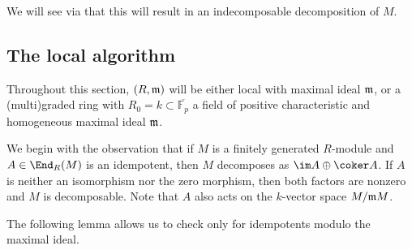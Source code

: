 \documentclass[12pt]{article}
\def\FF{\mathbb F}
\theoremstyle{theorem}
\numberwithin{thm}{section}
\theoremstyle{definition}
\begin{document}
We will see via  that this will result in an indecomposable decomposition of $M$.






\subsection{The local algorithm}\label{sec:main-alg}

Throughout this section, $(R,\mathfrak m)$ will be either local with maximal ideal $\mathfrak m$, or a (multi)graded ring with $R_0 = k \subset \overline{\FF_p}$ a field of positive characteristic and homogeneous maximal ideal $\mathfrak m$.

We begin with the observation that if $M$ is a finitely generated $R$-module and $A\in\End_R(M)$ is an idempotent, then $M$ decomposes as $\im A \oplus \coker A$. If $A$ is neither an isomorphism nor the zero morphism, then both factors are nonzero and $M$ is decomposable. Note that $A$ also acts on the $k$-vector space $M/\mathfrak m M$.

The following lemma allows us to check only for idempotents modulo the maximal ideal.
\end{document}
